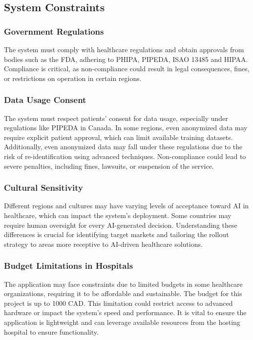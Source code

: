 \documentclass[12pt]{article}
\begin{document}
\subsection{System Constraints}

\subsubsection{Government Regulations}
The system must comply with healthcare regulations and obtain approvals from bodies such as the FDA, adhering to PHIPA, PIPEDA, ISAO 13485 and HIPAA. Compliance is critical, as non-compliance could result in legal consequences, fines, or restrictions on operation in certain regions.

\subsubsection{Data Usage Consent}
The system must respect patients' consent for data usage, especially under regulations like PIPEDA in Canada. In some regions, even anonymized data may require explicit patient approval, which can limit available training datasets. Additionally, even anonymized data may fall under these regulations due to the risk of re-identification using advanced techniques. Non-compliance could lead to severe penalties, including fines, lawsuits, or suspension of the service.

\subsubsection{Cultural Sensitivity}
Different regions and cultures may have varying levels of acceptance toward AI in healthcare, which can impact the system's deployment. Some countries may require human oversight for every AI-generated decision. Understanding these differences is crucial for identifying target markets and tailoring the rollout strategy to areas more receptive to AI-driven healthcare solutions.

\subsubsection{Budget Limitations in Hospitals}
The application may face constraints due to limited budgets in some healthcare organizations, requiring it to be affordable and sustainable. The budget for this project is up to 1000 CAD. This limitation could restrict access to advanced hardware or impact the system's speed and performance. It is vital to ensure the application is lightweight and can leverage available resources from the hosting hospital to ensure functionality.
\end{document}
